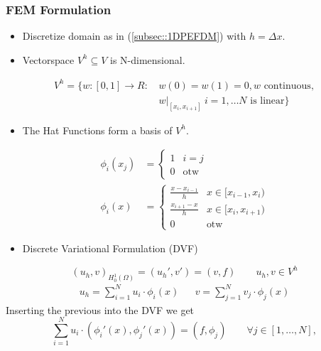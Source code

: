     \subsubsection{FEM Formulation}
        \begin{itemize}
            \item Discretize domain as in (\ref{subsec::1DPEFDM}) with $h = \Delta x$.
            \item Vectorspace $V^h \subseteq V$ is N-dimensional.
        \end{itemize}
        \begin{align*}
            V^h = \Big\{ w:[0,1] \to R: \,& w(0) = w(1) = 0, w \textrm{ continuous} , \\
                                          & w \rvert_{[x_i,x_{i+1}]} \ i = 1, \dots N \textrm{ is linear} \Big\}
        \end{align*}
        \begin{itemize}
            \item The Hat Functions form a basis of $V^h$.
        \end{itemize}
        \begin{align*}
            \phi_i(x_j) &= 
            \begin{cases}
                1 & i = j\\
                0 & \textrm{otw}
            \end{cases}
            \\
            \phi_i(x) &= 
            \begin{cases}
                \frac{x-x_{i-1}}{h} & x \in [x_{i-1},x_i)\\
                \frac{x_{i+1}-x}{h} & x \in [x_i,x_{i+1})\\
                0 & \textrm{otw}
            \end{cases}
        \end{align*}
        \begin{itemize}
            \item Discrete Variational Formulation (DVF)
        \end{itemize}
        $$
           (u_h,v)_{H_0^1(\Omega)} = \boxed{(u_h',v') = (v,f)} \qquad u_h,v \in V^h
        $$
        \begin{align*}
            u_h = \sum\limits_{i=1}^N u_i \cdot \phi_i(x) && v = \sum \limits_{j=1}^N v_j \cdot \phi_j(x)
        \end{align*}
        Inserting the previous into the DVF we get
        $$
            \sum\limits_{i=1}^N u_i \cdot (\phi_i'(x), \phi_j'(x)) = (f,\phi_j) \qquad \forall j \in [1,\dots ,N],
        $$
